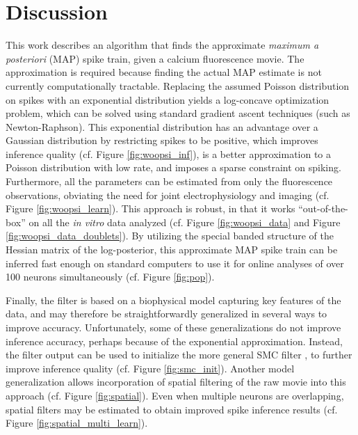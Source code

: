 




\section{Discussion} \label{sec:dis}



This work describes an algorithm that finds the approximate \emph{maximum a posteriori} (MAP) spike train, given a calcium fluorescence movie.  The approximation is required because finding the actual MAP estimate is not currently computationally tractable.  Replacing the assumed Poisson distribution on spikes with an exponential distribution yields a log-concave optimization problem, which can be solved using standard gradient ascent techniques (such as Newton-Raphson).  This exponential distribution has an advantage over a Gaussian distribution by restricting spikes to be positive, which improves inference quality (cf. Figure \ref{fig:woopsi_inf}), is a better approximation to a Poisson distribution with low rate, and imposes a sparse constraint on spiking. Furthermore,  all the parameters can be estimated from only the fluorescence observations, obviating the need for joint electrophysiology and imaging (cf. Figure \ref{fig:woopsi_learn}).  This approach is robust, in that it works ``out-of-the-box'' on all the \emph{in vitro}  data analyzed (cf. Figure \ref{fig:woopsi_data} and Figure \ref{fig:woopsi_data_doublets}). By utilizing the special banded structure of the Hessian matrix of the log-posterior, this approximate MAP spike train can be inferred fast enough on standard computers to use it for online analyses of over 100 neurons simultaneously (cf. Figure \ref{fig:pop}).


Finally, the \foopsi filter is based on a biophysical model capturing key features of the data, and may therefore be straightforwardly generalized in several ways to improve accuracy.  Unfortunately, some of these generalizations do not improve inference accuracy, perhaps because of the exponential approximation.  Instead, the \foopsi filter output can be used to initialize the more general SMC filter \cite{VogelsteinPaninski09}, to further improve inference quality (cf. Figure \ref{fig:smc_init}).  Another model generalization allows incorporation of spatial filtering of the raw movie into this approach (cf. Figure \ref{fig:spatial}). Even when multiple neurons are overlapping, spatial filters may be estimated to obtain improved spike inference results (cf. Figure \ref{fig:spatial_multi_learn}).

